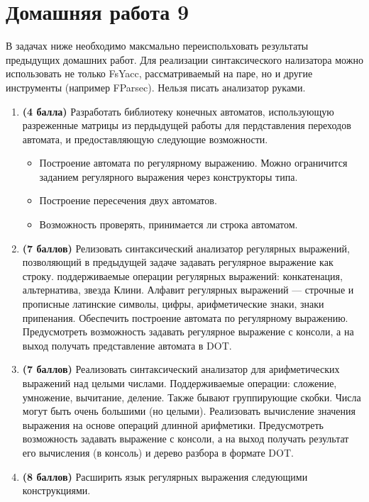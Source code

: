 \section{Домашняя работа 9}

В задачах ниже необходимо максмально переиспольховать результаты предыдущих домашних работ. Для реализации синтаксического нализатора можно использовать не только FsYacc, рассматриваемый на паре, но и другие инструменты (например FParsec). Нельзя писать анализатор руками.

\begin{enumerate}
  \item \textbf{(4 балла)} Разработать библиотеку конечных автоматов, использующую разреженные матрицы из пердыдущей работы для пердставления переходов автомата, и предоставляющую следующие возможности.
  \begin{itemize}
    \item Построение автомата по регулярному выражению. Можно ограничится заданием регулярного выражения через конструкторы типа.
    \item Построение пересечения двух автоматов.
    \item Возможность проверять, принимается ли строка автоматом.
  \end{itemize}
  \item \textbf{(7 баллов)} Релизовать синтаксический анализатор регулярных выражений, позволяющий в предыдущей задаче задавать регулярное выражение как строку. поддерживаемые операции регулярных выражений: конкатенация, альтернатива, звезда Клини. Алфавит регулярных выражений --- строчные и прописные латинские символы, цифры, арифметические знаки, знаки припенания. Обеспечить построение автомата по регулярному выражению. Предусмотреть возможность задавать регулярное выражение с консоли, а на выход получать представление автомата в DOT.
  \item \textbf{(7 баллов)} Реализовать синтаксический анализатор для арифметических выражений над целыми числами. Поддерживаемые операции: сложение, умножение, вычитание, деление. Также бывают группирующие скобки. Числа могут быть очень большими (но целыми). Реализовать вычисление значения выражения на основе операций длинной арифметики. Предусмотреть возможность задавать выражение с консоли, а на выход получать результат его вычисления (в консоль) и дерево разбора в формате DOT.
  \item \textbf{(8 баллов)} Расширить язык регулярных выражения следующими конструкциями.
  \begin{itemize}

\end{itemize}
\end{enumerate}
